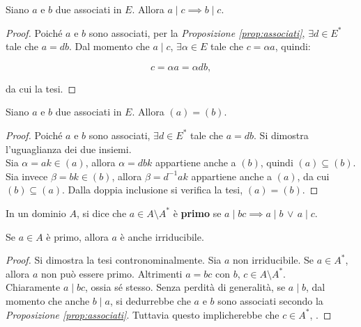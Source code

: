 \documentclass[11pt]{scrbook}
\begin{document}
\begin{proposition}
    \label{prop:divisione_associati}
    Siano $a$ e $b$ due associati in $E$. Allora $a \mid c \implies b \mid c$.
\end{proposition}

\begin{proof}
    Poiché $a$ e $b$ sono associati, per la \textit{Proposizione \ref{prop:associati}}, $\exists d \in E^*$ tale che
    $a = db$. Dal momento che $a \mid c$, $\exists \alpha \in E$ tale che
    $c = \alpha a$, quindi:

    \[ c = \alpha a = \alpha d b,\]

    da cui la tesi.
\end{proof}

\begin{proposition}
    \label{prop:associati_generatori}
    Siano $a$ e $b$ due associati in $E$. Allora
    $(a)=(b)$.
\end{proposition}

\begin{proof}
    Poiché $a$ e $b$ sono associati, $\exists d \in E^*$ tale che $a = db$. Si dimostra l'uguaglianza dei due insiemi. \\

    Sia $\alpha = ak \in (a)$, allora $\alpha = dbk$ appartiene anche a $(b)$, quindi $(a) \subseteq (b)$. Sia
    invece $\beta = bk \in (b)$, allora $\beta = d^{-1}ak$
    appartiene anche a $(a)$, da cui $(b) \subseteq (a)$.
    Dalla doppia inclusione si verifica la tesi, $(a)=(b)$.
\end{proof}

\begin{definition}
    In un dominio $A$, si dice che $a \in A \setminus A^*$ è \textbf{primo} se
    $a \mid bc \implies a \mid b \,\lor\, a \mid c$.
\end{definition}

\begin{proposition}
    Se $a \in A$ è primo, allora $a$ è anche irriducibile.
\end{proposition}

\begin{proof}
    Si dimostra la tesi contronominalmente. Sia $a$ non irriducibile. Se
    $a \in A^*$, allora $a$ non può essere primo. Altrimenti $a=bc$ con
    $b$, $c \in A \setminus A^*$. \\

    Chiaramente $a \mid bc$, ossia sé stesso. Senza perdità di generalità, se $a \mid b$, dal momento che anche $b \mid a$,
    si dedurrebbe che $a$ e $b$ sono associati secondo la
    \textit{Proposizione \ref{prop:associati}}. Tuttavia questo
    implicherebbe che $c \in A^*$, \Lightning{}.
\end{proof}
\end{document}
